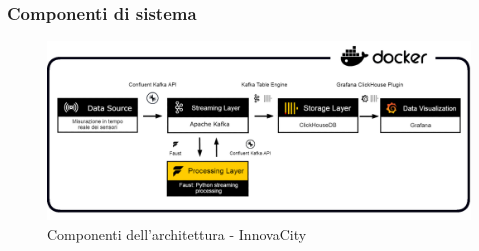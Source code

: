 \subsubsection{Componenti di sistema}
\begin{figure}[H]
    \centering
    \includegraphics[width=1\textwidth]{../Images/SpecificaTecnica/Architettura_PB_microservices2.png}
    \caption{Componenti dell'architettura - InnovaCity}
    \label{fig: componenti_architettura}
\end{figure}

